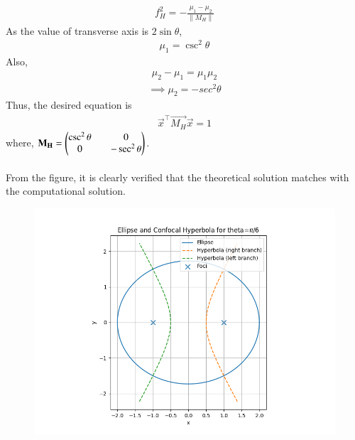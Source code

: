 \documentclass[journal]{IEEEtran}
\begin{document}
\begin{align}
    f_H^2=-\frac{\mu_1-\mu_2}{\|M_H\|}
\end{align}
As the value of transverse axis is $2\sin{\theta}$,
\begin{align}
    \mu_1=\csc^2{\theta}
\end{align}
Also,
\begin{align}
    \mu_2-\mu_1=\mu_1\mu_2
\end{align}
\begin{align}
    \implies \mu_2=-sec^2{\theta}
\end{align}
Thus, the desired equation is
\begin{align}
    \vec{x}^{\top}\vec{M_H}\vec{x}=1
\end{align}
where, $\mathbf{M_H}=\begin{pmatrix}\csc^2{\theta}&&0\\0&&-\sec^2{\theta}\end{pmatrix}$.\\
\\
From the figure, it is clearly verified that the theoretical solution matches with the computational solution.\\
\begin{figure}[H]
    \centering
    \includegraphics[width=0.8\columnwidth]{figs/Figure_1.png}
    \label{fig:1}
\end{figure}
\end{document}
